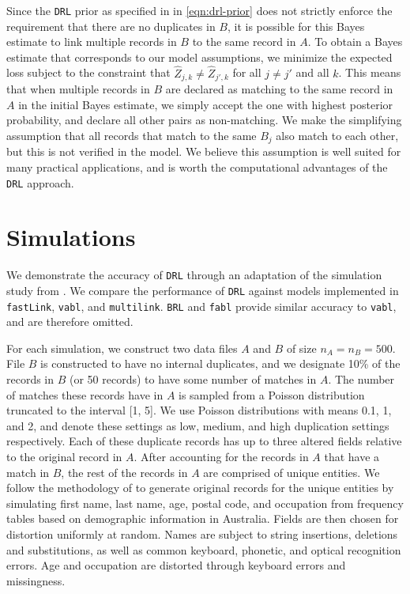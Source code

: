 \documentclass[12pt,letterpaper]{article}
\newcommand{\1}[1]{\mathbb{I}\!\left[#1\right]} %
\begin{document}
Since the \texttt{DRL} prior as specified in in \eqref{eqn:drl-prior} does not strictly enforce the requirement that there are no duplicates in $B$, it is possible for this Bayes estimate to link multiple records in $B$ to the same record in $A$. To obtain a Bayes estimate that corresponds to our model assumptions, we minimize the expected loss subject to the constraint that $\hat{Z}_{j, k} \neq \hat{Z}_{j', k}$ for all $j \neq j'$ and all $k$. This means that when multiple records in $B$ are declared as matching to the same record in $A$ in the initial Bayes estimate, we simply accept the one with highest posterior probability, and declare all other pairs as non-matching. We make the simplifying assumption that all records that match to the same $B_j$ also match to each other, but this is not verified in the model. We believe this assumption is well suited for many practical applications, and is worth the computational advantages of the \texttt{DRL} approach.

\section{Simulations}\label{sec:simulations}

We demonstrate the accuracy of \texttt{DRL} through an adaptation of the simulation study from \cite{aleshin2023multifile}. We compare the performance of \texttt{DRL} against models implemented in \texttt{fastLink}, \texttt{vabl}, and \texttt{multilink}.  \texttt{BRL} and \texttt{fabl} provide similar accuracy to \texttt{vabl}, and are therefore omitted. 

For each simulation, we construct two data files $A$ and $B$ of size $n_A = n_B = 500$. File $B$ is constructed to have no internal duplicates, and we designate 10\% of the records in $B$ (or 50 records) to have some number of matches in $A$. The number of matches these records have in $A$ is sampled from a Poisson distribution truncated to the interval [1, 5]. We use Poisson distributions with means 0.1, 1, and 2, and denote these settings as low, medium, and high duplication settings respectively. Each of these duplicate records has up to three altered fields relative to the original record in $A$. After accounting for the records in $A$ that have a match in $B$, the rest of the records in $A$ are comprised of unique entities. We follow the methodology of \cite{christen_vatsalan2013} to generate original records for the unique entities by simulating first name, last name, age, postal code, and occupation from frequency tables based on demographic information in Australia. Fields are then chosen for distortion uniformly at random. Names are subject to string insertions, deletions and substitutions, as well as common keyboard, phonetic, and optical recognition errors. Age and occupation are distorted through keyboard errors and missingness.
\end{document}
